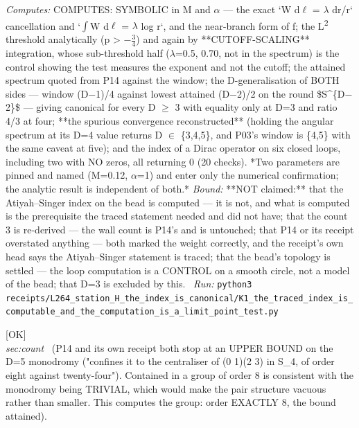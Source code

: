 \begin{description}
\emph{Computes:} COMPUTES: SYMBOLIC in M and \ensuremath{\alpha} --- the exact `W d\ensuremath{\ell} = \ensuremath{\lambda} dr/r` cancellation and `\ensuremath{\int}W d\ensuremath{\ell} = \ensuremath{\lambda} log r`, and the near-branch form of f; the L\textsuperscript{2} threshold analytically (p > \ensuremath{-}\ensuremath{\tfrac34}) and again by **CUTOFF-SCALING** integration, whose sub-threshold half (\ensuremath{\lambda}=0.5, 0.70, not in the spectrum) is the control showing the test measures the exponent and not the cutoff; the attained spectrum quoted from P14 against the window; the D-generalisation of BOTH sides --- window (D\ensuremath{-}1)/4 against lowest attained (D\ensuremath{-}2)/2 on the round \$S\textasciicircum{}\{D\ensuremath{-}2\}\$ --- giving canonical for every D \ensuremath{\ge} 3 with equality only at D=3 and ratio 4/3 at four; **the spurious convergence reconstructed** (holding the angular spectrum at its D=4 value returns D \ensuremath{\in} \{3,4,5\}, and P03's window is \{4,5\} with the same caveat at five); and the index of a Dirac operator on six closed loops, including two with NO zeros, all returning 0 (20 checks).  *Two parameters are pinned and named (M=0.12, \ensuremath{\alpha}=1) and enter only the numerical confirmation; the analytic result is independent of both.*
 \emph{Bound:} **NOT claimed:** that the Atiyah--Singer index on the bead is computed --- it is not, and what is computed is the prerequisite the traced statement needed and did not have; that the count 3 is re-derived --- the wall count is P14's and is untouched; that P14 or its receipt overstated anything --- both marked the weight correctly, and the receipt's own head says the Atiyah--Singer statement is traced; that the bead's topology is settled --- the loop computation is a CONTROL on a smooth circle, not a model of the bead; that D=3 is excluded by this.
\ \emph{Run:} \texttt{python3 receipts/L264\_station\_H\_the\_index\_is\_canonical/K1\_the\_traced\_index\_is\_computable\_and\_the\_computation\_is\_a\_limit\_point\_test.py}
\item[\rcptlabel{I51_the_monodromy_bound_is_attained_and_the_four_dimensional_contrast_is_real}{P14R54}\textbf{P14R54}\quad\texttt{I51\_the\_monodromy\_bound\_is\_attained\_and\_the\_four\_dimensional\_contrast\_is\_real}]\hfill\textsf{[OK]}\\
\textit{sec:count} \ (P14 and its own receipt both stop at an UPPER BOUND on the D=5 monodromy ("confines it to the centraliser of (0 1)(2 3) in S\_4, of order eight against twenty-four"). Contained in a group of order 8 is consistent with the monodromy being TRIVIAL, which would make the pair structure vacuous rather than smaller. This computes the group: order EXACTLY 8, the bound attained). 

\end{description}
